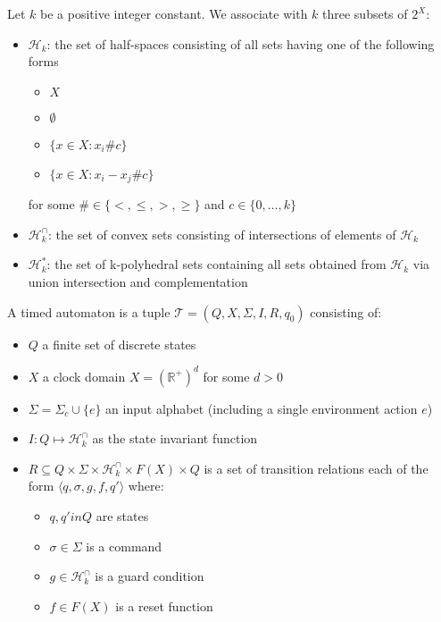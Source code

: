 \documentclass[table]{beamer}
\begin{document}
\begin{frame}
	\begin{dfn}
		Let $k$ be a positive integer constant. We associate with $k$ three subsets of $2^X$:
		\begin{itemize}
			\item $\mathcal{H}_k$: the set of half-spaces consisting of all sets having one of the following forms
				\begin{itemize}
					\item $X$
					\item $\emptyset$
					\item $\{x \in X:x_i \# c\}$
					\item $\{x \in X:x_i-x_j \# c\}$
				\end{itemize}
				for some $\# \in \{<,\leq,>,\geq\}$ and $c \in \{0,\ldots,k\}$
			\item $\mathcal{H}^\cap_k$: the set of convex sets consisting of intersections of elements of $\mathcal{H}_k$
			\item $\mathcal{H}^*_k$: the set of k-polyhedral sets containing all sets obtained from $\mathcal{H}_k$ via union intersection and complementation
		\end{itemize}
	\end{dfn}
\end{frame}

\begin{frame}
	\begin{dfn}
		A timed automaton is a tuple $\mathcal{T}=\left( Q,X,\Sigma,I,R,q_0\right)$ consisting of:
		\begin{itemize}
			\item $Q$ a finite set of discrete states
			\item $X$ a clock domain $X=(\mathbb{R}^+)^d$ for some $d>0$
			\item $\Sigma=\Sigma_c \cup \{e\}$ an input alphabet (including a single environment action $e$)
			\item $I:Q \mapsto \mathcal{H}^\cap_k$ as the state invariant function
			\item $R \subseteq Q \times \Sigma \times \mathcal{H}^\cap_k \times F(X) \times Q$ is
			 a set of transition relations each of the form $\langle q,\sigma,g,f,q'\rangle$ where:
			\begin{itemize}
				\item $q,q' in Q$ are states
				\item $\sigma \in \Sigma$ is a command
				\item $g \in \mathcal{H}^\cap_k$ is a guard condition
				\item $f \in F(X)$ is a reset function
			\end{itemize}
		\end{itemize}
	\end{dfn}
\end{frame}
\end{document}
